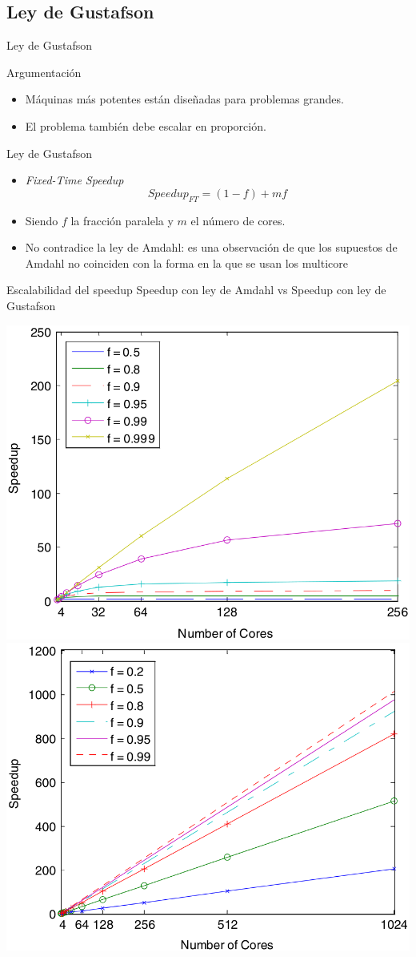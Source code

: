 \documentclass[utf8]{beamer}
\begin{document}
\subsection*{Ley de Gustafson}

\begin{frame}[allowframebreaks]{Ley de Gustafson}
    \begin{block}{Argumentación}
        \begin{itemize}
            \item Máquinas más potentes están diseñadas para problemas grandes.
            \item El problema también debe escalar en proporción.
        \end{itemize}
    \end{block}
    \begin{block}{Ley de Gustafson}
        \begin{itemize}
            \item \emph{Fixed-Time Speedup}
            $$ Speedup_{FT} = (1 - f) + mf $$
            \item Siendo $f$ la fracción paralela y $m$ el número de cores.
            \item No contradice la ley de Amdahl: es una observación de que los supuestos de Amdahl no coinciden con la forma en la que se usan los multicore
        \end{itemize}
    \end{block}
    \begin{block}{Escalabilidad del speedup}
        Speedup con ley de Amdahl vs Speedup con ley de Gustafson
    \end{block}
    \begin{center}
        \includegraphics[width=.5\linewidth]{figures/fixedsize_speedup}
        \includegraphics[width=.5\linewidth]{figures/fixedtime_speedup}
    \end{center}
\end{frame}
\end{document}
